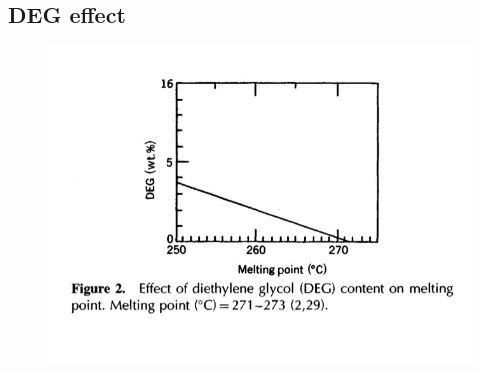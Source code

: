 \documentclass[a4paper, 11pt]{article}
\begin{document}
\subsection	{DEG effect}

\begin{figure}[h!]
\centering
{\includegraphics[scale=0.4]{DEG}} \quad 
\captionsetup{justification=centering}
\end{figure}
\end{document}
